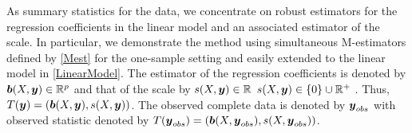 \documentclass[11pt]{article}
\def\bth{\mbox{\boldmath $\theta$}}
\def\bbeta{\mbox{\boldmath $\beta$}}
\newcommand{\by}{\mbox{\boldmath $y$}}
\newcommand{\bb}{\mbox{\boldmath $b$}}
\newcommand{\green}[1]{{\color{green}#1}}
\DeclareMathOperator*{\argmin}{\arg\!\min}
\begin{document}
As summary statistics for the data, we concentrate on robust estimators for the 
\green{regression} coefficients in the linear model and an associated 
estimator of the scale. In particular, we demonstrate the method using simultaneous M-estimators defined by \eqref{Mest} for the one-sample setting and easily extended to the linear model in \eqref{LinearModel}. The estimator of the \green{regression} coefficients is denoted by $\bb(X, \by)\in \mathbb R^{p}$ and that of the scale by \green{\sout{$s(X, \by)\in \mathbb R$} $s(X, \by)\in \{0\} \cup {\mathbb R}^+$} . Thus, $T(\by)=(\bb(X, \by), s(X, \by))$. The observed complete data is denoted by $\by_{obs}$ with observed statistic  denoted by $T(\by_{obs})=(\bb(X, \by_{obs}), s(X, \by_{obs}))$. %

\end{document}
